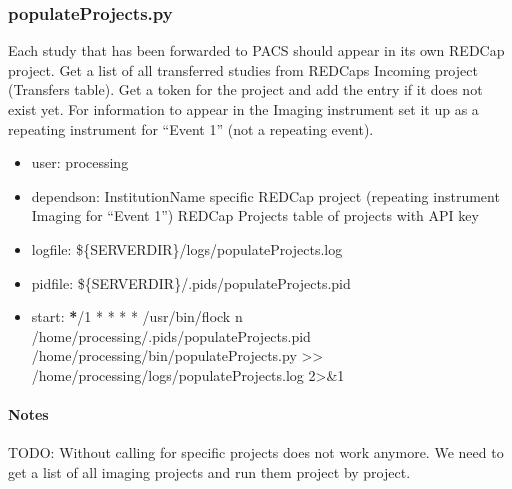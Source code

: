 \documentclass[letterpaper,10pt,english]{sphinxmanual}
\begin{document}
\subsubsection{populateProjects.py}
\label{\detokenize{Architecture/scripts/populateProjects:populateprojects-py}}\label{\detokenize{Architecture/scripts/populateProjects::doc}}
\sphinxAtStartPar
Each study that has been forwarded to PACS should appear in its own REDCap project. Get a list of all transferred studies from REDCaps Incoming project (Transfers table). Get a token for the project and add the entry \sphinxhyphen{} if it does not exist yet. For information to appear in the Imaging instrument set it up as a repeating instrument for “Event 1” (not a repeating event).
\begin{itemize}
\item {} 
\sphinxAtStartPar
user: processing

\item {} 
\sphinxAtStartPar
depends\sphinxhyphen{}on:
\sphinxhyphen{} InstitutionName specific REDCap project (repeating instrument Imaging for “Event 1”)
\sphinxhyphen{} REDCap Projects table of projects with API key

\item {} 
\sphinxAtStartPar
log\sphinxhyphen{}file:
\sphinxhyphen{} \$\{SERVERDIR\}/logs/populateProjects.log

\item {} 
\sphinxAtStartPar
pid\sphinxhyphen{}file: \$\{SERVERDIR\}/.pids/populateProjects.pid

\item {} 
\sphinxAtStartPar
start:
{\color{red}\bfseries{}*}/1 * * * *  /usr/bin/flock \sphinxhyphen{}n /home/processing/.pids/populateProjects.pid /home/processing/bin/populateProjects.py \textgreater{}\textgreater{} /home/processing/logs/populateProjects.log 2\textgreater{}\&1

\end{itemize}


\paragraph{Notes}
\label{\detokenize{Architecture/scripts/populateProjects:notes}}
\sphinxAtStartPar
TODO: Without calling for specific projects does not work anymore. We need to get a list of all imaging projects and run them project by project.

\sphinxstepscope
\end{document}
